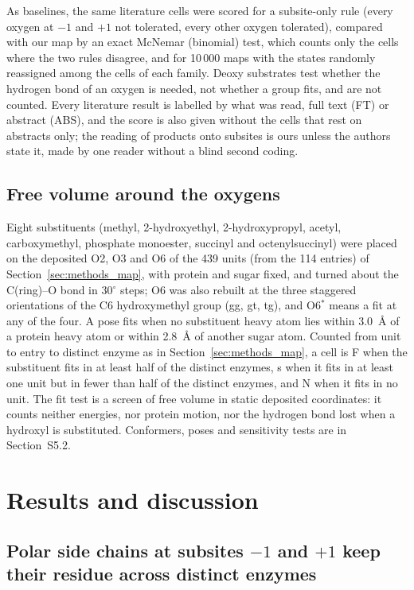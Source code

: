 \documentclass[preprint,12pt]{elsarticle}
\begin{document}
As baselines, the same literature cells were scored for a subsite-only rule (every oxygen at $-1$ and $+1$ not tolerated,
every other oxygen tolerated), compared with our map by an exact McNemar (binomial) test, which counts only the cells where
the two rules disagree, and for 10\,000 maps with the states randomly reassigned among the cells of each family. Deoxy
substrates test whether the hydrogen bond of an oxygen is needed, not whether a group fits, and are not counted.
Every literature result is labelled by what was read, full text (FT) or abstract (ABS), and the score is also given
without the cells that rest on abstracts only; the reading of products onto subsites is ours unless the authors state
it, made by one reader without a blind second coding.

\subsection{Free volume around the oxygens}\label{sec:methods_fit}
Eight substituents (methyl, 2-hydroxyethyl, 2-hydroxypropyl, acetyl, carboxymethyl, phosphate monoester,
succinyl and octenylsuccinyl) were placed on the deposited O2, O3 and O6 of the
439 units (from the 114 entries) of Section~\ref{sec:methods_map}, with protein and sugar fixed, and turned about the C(ring)--O bond
in 30$^\circ$ steps; O6 was also rebuilt at the three staggered orientations of the C6 hydroxymethyl group (gg, gt, tg), and O6$^\ast$ means a fit at any of
the four. A pose fits when no substituent heavy atom lies within 3.0~\AA{} of a protein heavy atom or within
2.8~\AA{} of another sugar atom. Counted from unit to entry to distinct enzyme as in
Section~\ref{sec:methods_map}, a cell is F when the substituent fits in at least half of the distinct enzymes, s when
it fits in at least one unit but in fewer than half of the distinct enzymes, and N when it fits in no unit. The fit test is a screen of
free volume in static deposited coordinates: it counts neither energies, nor protein motion, nor the hydrogen bond
lost when a hydroxyl is substituted. Conformers, poses and sensitivity tests are in Section~S5.2.

\section{Results and discussion}

\subsection{Polar side chains at subsites $-1$ and $+1$ keep their residue across distinct enzymes}\label{sec:rule}
\end{document}
